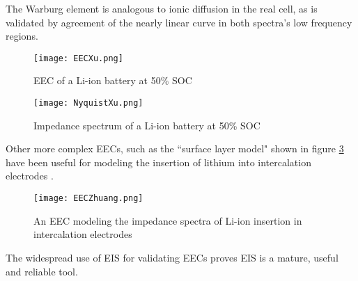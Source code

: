 The Warburg element is analogous to  ionic diffusion in the real cell, as is validated by agreement of the nearly linear curve in both spectra's low frequency regions.
\begin{figure}[H]
\centering
\texttt{[image: EECXu.png]}
\caption{EEC of a Li-ion battery at 50\% SOC
\label{fig:XuEEC}
\cite{JunXu2013}}
\end{figure}
%
\begin{figure}[H]
\centering
\texttt{[image: NyquistXu.png]}
\caption{Impedance spectrum of a Li-ion battery at 50\% SOC
\label{fig:XuNyquist}
\cite{JunXu2013}}
\end{figure}
%
Other more complex EECs, such as the ``surface layer model"  shown in figure \ref{fig:EECZhuang} have been useful for modeling the insertion of lithium into intercalation electrodes %
\cite[p.~192]{Zhuang2012}.
\begin{figure}[H]
\centering
\texttt{[image: EECZhuang.png]}
\caption{An EEC modeling the impedance spectra of Li-ion insertion in intercalation electrodes
\label{fig:EECZhuang}
\cite{Zhuang2012}}
\end{figure}
The widespread use of EIS for validating EECs proves EIS is a mature, useful and reliable tool.

